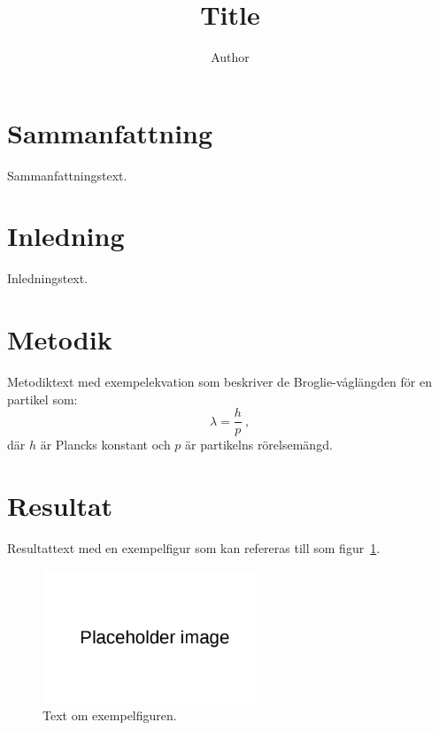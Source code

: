 \documentclass{aplreport}
\title{Title}
\subtitle{}
\author{Author}
\begin{document}
\maketitlepages



\section{Sammanfattning}
\label{sec:summary}

Sammanfattningstext.

\section{Inledning}
\label{sec:introduction}

Inledningstext.

\section{Metodik}
\label{sec:method}

Metodiktext med exempelekvation som beskriver de Broglie-våglängden för en partikel som:
%
\begin{equation}
  \lambda = \frac{h}{p}~,
  \label{eq:wavelength}
\end{equation}
%
där $h$ är Plancks konstant och $p$ är partikelns rörelsemängd.

\section{Resultat}
\label{sec:results}

Resultattext med en exempelfigur som kan refereras till som figur~\ref{fig:placeholderfigure}.

\begin{figure}[htb]
  \centering
  \includegraphics[height=4.0cm]{base_figures/placeholder.png}
  \caption{Text om exempelfiguren.}
  \label{fig:placeholderfigure}
\end{figure}
\end{document}
